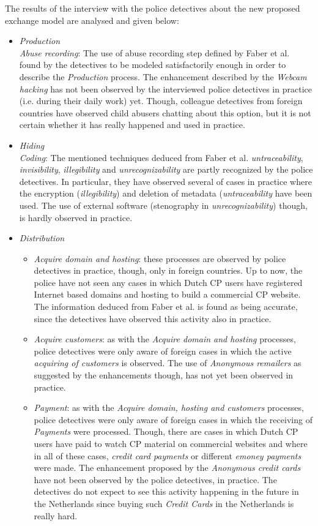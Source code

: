 \documentclass{sig-alternate-br}
\begin{document}
The results of the interview with the police detectives about the new proposed exchange model are analysed and given below:
\begin{itemize}
	\item \textit{Production}\\
		\textit{Abuse recording}: The use of abuse recording step defined by Faber et al. \cite{en2011phishing} found by the detectives to be modeled satisfactorily enough in order to describe the \textit{Production} process. The enhancement described by the \textit{Webcam hacking} \cite{mishna2009ongoing,salomon2010examples} has not been observed by the interviewed police detectives in practice (i.e. during their daily work) yet. Though, colleague detectives from foreign countries have observed child abusers chatting about this option, but it is not certain whether it has really happened and used in practice.
	\item \textit{Hiding}\\
		\textit{Coding}: The mentioned techniques deduced from Faber et al. \cite{en2011phishing} \textit{untraceability}, \textit{invisibility}, \textit{illegibility} and \textit{unrecognizability} are partly recognized by the police detectives. In particular, they have observed several of cases in practice where the encryption (\textit{illegibility}) and deletion of metadata (\textit{untraceability} have been used. The use of external software (stenography in \textit{unrecognizability}) though, is hardly observed in practice.
	\item \textit{Distribution}
		\begin{itemize}
			\item \textit{Acquire domain and hosting}: these processes are observed by police detectives in practice, though, only in foreign countries. Up to now, the police have not seen any cases in which Dutch CP users have registered Internet based domains and hosting to build a commercial CP website. The information deduced from Faber et al. \cite{en2011phishing} is found as being accurate, since the detectives have observed this activity also in practice.
			\item \textit{Acquire customers}: as with the \textit{Acquire domain and hosting} processes, police detectives were only aware of foreign cases in which the active \textit{acquiring of customers} is observed. The use of \textit{Anonymous remailers} as suggested by the enhancements though, has not yet been observed in practice.
			\item \textit{Payment}: as with the \textit{Acquire domain, hosting and customers} processes, police detectives were only aware of foreign cases in which the receiving of \textit{Payments} were processed. Though, there are cases in which Dutch CP users have paid to watch CP material on commercial websites and where in all of these cases, \textit{credit card payments} or different \textit{emoney payments} were made. The enhancement proposed by the \textit{Anonymous credit cards} have not been observed by the police detectives, in practice. The detectives do not expect to see this activity happening in the future in the Netherlands since buying such \textit{Credit Cards} in the Netherlands is really hard.

\end{itemize}
\end{itemize}
\end{document}
